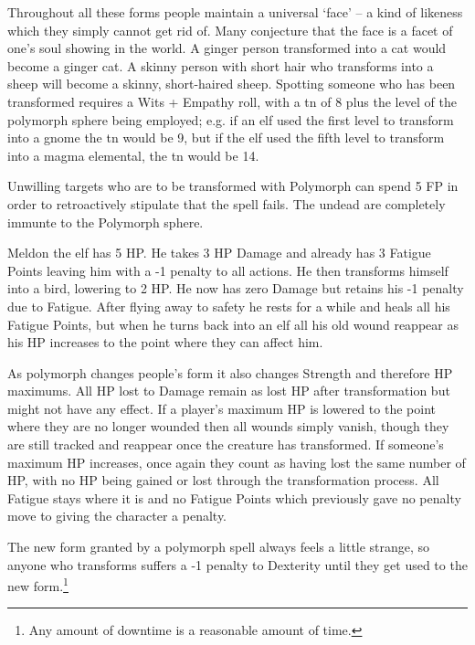 \documentclass[titlepage,a4paper,openany]{book}
\begin{document}
\begin{multicols}{2}
Throughout all these forms people maintain a universal `face' -- a kind of likeness which they simply cannot get rid of. Many conjecture that the face is a facet of one's soul showing in the world. A ginger person transformed into a cat would become a ginger cat. A skinny person with short hair who transforms into a sheep will become a skinny, short-haired sheep. Spotting someone who has been transformed requires a Wits + Empathy roll, with a \gls{tn} of 8 plus the level of the polymorph sphere being employed; e.g. if an elf used the first level to transform into a gnome the \gls{tn} would be 9, but if the elf used the fifth level to transform into a magma elemental, the \gls{tn} would be 14.

Unwilling targets who are to be transformed with Polymorph can spend 5 FP in order to retroactively stipulate that the spell fails.  The undead are completely immunte to the Polymorph sphere.

\begin{exampletext}

	Meldon the elf has 5 HP. He takes 3 HP Damage and already has 3 Fatigue Points leaving him with a -1 penalty to all actions. He then transforms himself into a bird, lowering to 2 HP. He now has zero Damage but retains his -1 penalty due to Fatigue. After flying away to safety he rests for a while and heals all his Fatigue Points, but when he turns back into an elf all his old wound reappear as his HP increases to the point where they can affect him.

\end{exampletext}

As polymorph changes people's form it also changes Strength and therefore HP maximums. All HP lost to Damage remain as lost HP after transformation but might not have any effect. If a player's maximum HP is lowered to the point where they are no longer wounded then all wounds simply vanish, though they are still tracked and reappear once the creature has transformed. If someone's maximum HP increases, once again they count as having lost the same number of HP, with no HP being gained or lost through the transformation process. All Fatigue stays where it is and no Fatigue Points which previously gave no penalty move to giving the character a penalty.

The new form granted by a polymorph spell always feels a little strange, so anyone who transforms suffers a -1 penalty to Dexterity until they get used to the new form.\footnote{Any amount of downtime is a reasonable amount of time.}


\end{multicols}
\end{document}
